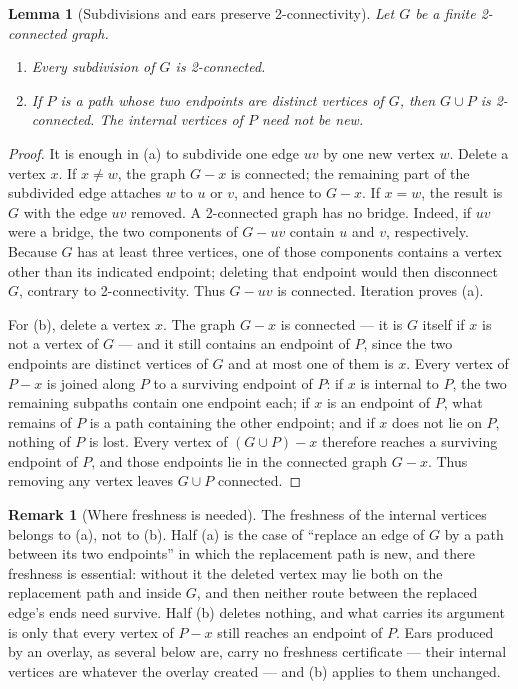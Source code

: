 \documentclass[11pt]{article}
\theoremstyle{mainplain}
\theoremstyle{mainroman}
\newtheorem{longlemma}[theorem]{Lemma}
\theoremstyle{definition}
\newtheorem{remark}[theorem]{Remark}
\newcommand{\alphlabels}{\renewcommand{\labelenumi}{\textup{(\alph{enumi})}}%
  \renewcommand{\theenumi}{\alph{enumi}}}
\numberwithin{equation}{section}
\begin{document}
\begin{longlemma}[Subdivisions and ears preserve 2-connectivity]\label{lem:subdivision-ear-preserve}
Let $G$ be a finite 2-connected graph.
\begin{enumerate}\alphlabels
\item Every subdivision of $G$ is 2-connected.
\item If $P$ is a path whose two endpoints are distinct vertices of
      $G$, then $G\cup P$ is 2-connected. The internal vertices of $P$
      need not be new.
\end{enumerate}
\end{longlemma}
\begin{proof}
It is enough in (a) to subdivide one edge $uv$ by one new vertex $w$.
Delete a vertex $x$. If $x\ne w$, the graph $G-x$ is connected; the
remaining part of the subdivided edge attaches $w$ to $u$ or $v$, and
hence to $G-x$. If $x=w$, the result is $G$ with the edge $uv$
removed. A 2-connected graph has no bridge. Indeed, if $uv$ were a
bridge, the two components of $G-uv$ contain $u$ and $v$, respectively.
Because $G$ has at least three vertices, one of those components contains
a vertex other than its indicated endpoint; deleting that endpoint would
then disconnect $G$, contrary to 2-connectivity. Thus $G-uv$ is
connected. Iteration proves (a).

For (b), delete a vertex $x$. The graph $G-x$ is connected --- it is
$G$ itself if $x$ is not a vertex of $G$ --- and it still contains an
endpoint of $P$, since the two endpoints are distinct vertices of $G$
and at most one of them is $x$. Every vertex of $P-x$ is joined along
$P$ to a surviving endpoint of $P$: if $x$ is internal to $P$, the two
remaining subpaths contain one endpoint each; if $x$ is an endpoint of
$P$, what remains of $P$ is a path containing the other endpoint; and
if $x$ does not lie on $P$, nothing of $P$ is lost. Every vertex of
$(G\cup P)-x$ therefore reaches a surviving endpoint of $P$, and those
endpoints lie in the connected graph $G-x$. Thus removing any vertex
leaves $G\cup P$ connected.
\end{proof}

\begin{remark}[Where freshness is needed]\label{rem:ear-freshness}
The freshness of the internal vertices belongs to (a), not to (b).
Half (a) is the case of ``replace an edge of $G$ by a path between its
two endpoints'' in which the replacement path is new, and there
freshness is essential: without it the deleted vertex may lie both on
the replacement path and inside $G$, and then neither route between
the replaced edge's ends need survive. Half (b) deletes nothing, and
what carries its argument is only that every vertex of $P-x$ still
reaches an endpoint of $P$. Ears produced by an overlay, as several
below are, carry no freshness certificate --- their internal vertices
are whatever the overlay created --- and (b) applies to them
unchanged.
\end{remark}
\end{document}
